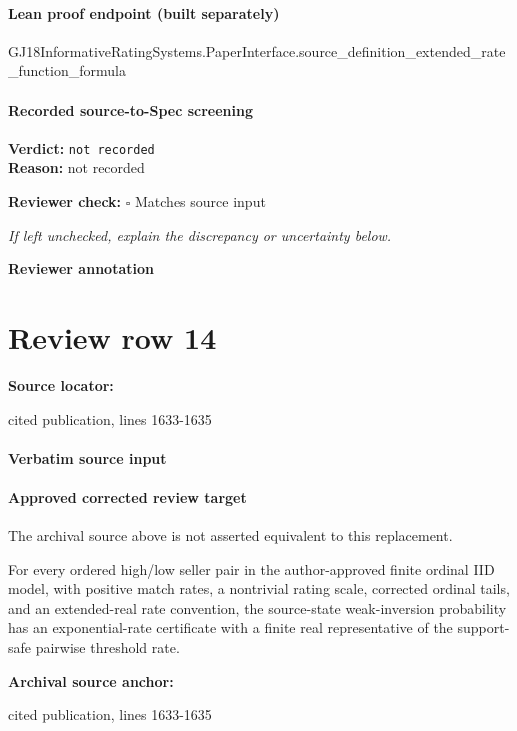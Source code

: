 \documentclass[10pt]{article}
\newcommand{\reviewerbox}{%
  \par\noindent\fbox{\parbox{0.96\linewidth}{\rule{0pt}{0.38in}}}\par
}
\newcommand{\reviewmatch}[1]{%
  \par\noindent\textbf{Reviewer check:} $\square$\; #1\par
  \noindent\emph{If left unchecked, explain the discrepancy or uncertainty below.}\par
}
\begin{document}
\paragraph{Lean proof endpoint (built separately)}\begin{ReviewVerbatim}
GJ18InformativeRatingSystems.PaperInterface.source_definition_extended_rate_function_formula
\end{ReviewVerbatim}

\paragraph{Recorded source-to-Spec screening}
\textbf{Verdict:} \texttt{not recorded}
\\
\textbf{Reason:} not recorded
\reviewmatch{Matches source input}
\noindent\textbf{Reviewer annotation}\par
\reviewerbox
\clearpage
\hypertarget{source-claim-21cfbf055e49cb54}{}
\section*{Review row 14}
\textbf{Source locator:} {\footnotesize\raggedright cited publication, lines 1633-\allowbreak{}1635\par}
\paragraph{Verbatim source input}
\begin{ReviewVerbatim}
\end{ReviewVerbatim}

\paragraph{Approved corrected review target}
The archival source above is not asserted equivalent to this replacement.
\begin{ReviewVerbatim}
For every ordered high/low seller pair in the author-approved finite ordinal IID model, with positive match rates, a nontrivial rating scale, corrected ordinal tails, and an extended-real rate convention, the source-state weak-inversion probability has an exponential-rate certificate with a finite real representative of the support-safe pairwise threshold rate.
\end{ReviewVerbatim}

\textbf{Archival source anchor:} {\footnotesize\raggedright cited publication, lines 1633-\allowbreak{}1635\par}
\end{document}
